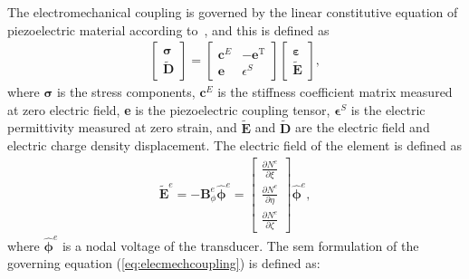 \documentclass[11pt,a4paper,final]{report}
\theoremstyle{plain}
\begin{document}
The electromechanical coupling is governed by the linear constitutive equation of piezoelectric material according to~\cite{giurgiutiu2009micromechatronics, rekatsinas2017cubic}, and this is defined as
\begin{eqnarray}
	\left [ 
	\begin {array}{c}
	\boldsymbol{\sigma}\\
	\widetilde{\textbf{D}}
\end{array}\right ]=
\left [ 
\begin{array}{cc}
	\textbf{c}^E & -\textbf{e}^{\mathrm{T}} \\
	\textbf{e} & \epsilon^S 
\end{array} \right ]
\left[ 
\begin{array}{c}
	\boldsymbol{\varepsilon}\\
	\widetilde{\textbf{E}} 
\end{array} \right ],
\label{eq:elecmechcoupling}
\end{eqnarray}
where \(\boldsymbol{\sigma}\) is the stress components, \(\textbf{c}^E\) is the stiffness coefficient matrix measured at zero electric field, \textbf{e} is the piezoelectric coupling tensor, \(\boldsymbol{\epsilon}^S\) is the electric permittivity measured at zero strain, and \(\widetilde{\textbf{E}}\) and \(\widetilde{\textbf{D}}\) are the electric field and electric charge density displacement.
The electric field of the element is defined as
\begin{eqnarray}
\widetilde{\textbf{E}}^e=-\textbf{B}_\phi^e \widehat{\boldsymbol{\phi}}^e = \left[ \begin{array}{c}
	\frac{\partial N^e}{\partial \xi}\\
	\frac{\partial N^e}{\partial \eta}\\
	\frac{\partial N^e}{\partial \zeta}
\end{array} \right] \widehat{\boldsymbol{\phi}}^e,
\end{eqnarray}
where \(\widehat{\boldsymbol{\phi}}^e\) is a nodal voltage of the transducer. The \ac{sem} formulation of the governing equation (\ref{eq:elecmechcoupling}) is defined as:
\end{document}
